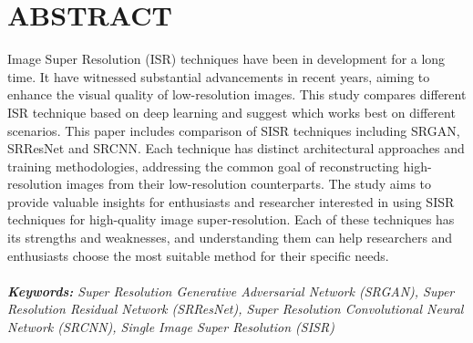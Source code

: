 \newpage

\section*{ABSTRACT}

Image Super Resolution (ISR) techniques have been in development for a long time. It have witnessed substantial advancements in recent years, aiming to enhance the visual quality of low-resolution images. This study compares different ISR technique based on deep learning and suggest which works best on different scenarios. This paper includes comparison of SISR techniques including SRGAN, SRResNet and SRCNN. Each technique has distinct architectural approaches and training methodologies, addressing the common goal of reconstructing high-resolution images from their low-resolution counterparts. The study aims to provide valuable insights for enthusiasts and researcher interested in using SISR techniques for high-quality image super-resolution. Each of these techniques has its strengths and weaknesses, and understanding them can help researchers and enthusiasts choose the most suitable method for their specific needs.
\\
\\
\textit {{\bf Keywords:}  Super Resolution Generative Adversarial Network (SRGAN), Super Resolution Residual Network (SRResNet), Super Resolution Convolutional Neural Network (SRCNN), Single Image Super Resolution (SISR) }